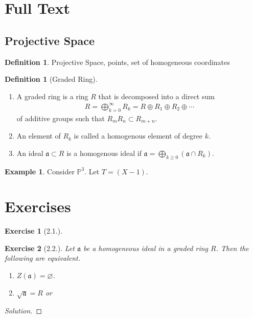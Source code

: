\documentclass[11pt]{book}
\newtheorem{exercise}{Exercise}[section]
\newenvironment{solution}
  {\renewcommand{\qedsymbol}{}\begin{proof}[Solution]}
  {\end{proof}}
\theoremstyle{definition}
\newtheorem{definition}[theorem]{Definition}
\newtheorem{example}[theorem]{Example}
\numberwithin{equation}{section}
\begin{document}
\section{Full Text}

\subsection{Projective Space}
\begin{defbox}
    \begin{definition}
        Projective Space, points, set of homogeneous coordinates
    \end{definition}
\end{defbox}
\begin{defbox}
    \begin{definition}[Graded Ring]
        \begin{enumerate}
            \item A graded ring is a ring \(R\) that is decomposed into a direct sum
            \begin{align*}
                R = \bigoplus_{k=0}^\infty R_k = R \oplus R_1 \oplus R_2 \oplus \cdots
            \end{align*}
            of additive groups such that \(R_m R_n \subset R_{m+n}\).
            \item An element of \(R_k\) is called a homogenous element of degree \(k\).
            \item An ideal \(\mathfrak{a} \subset R\) is a homogenous ideal if \(\mathfrak{a} = \bigoplus_{k \geq 0}(\mathfrak{a} \cap R_k)\).
        \end{enumerate}

    \end{definition}
\end{defbox}

\begin{example}
    Consider \(\mathbb{P}^3\). Let \(T = (X - 1)\).
\end{example}

\newpage
\section{Exercises}
\begin{exercise}[2.1.]
    
\end{exercise}

\begin{exercise}[2.2.]
    Let \(\mathfrak{a}\) be a homogeneous ideal in a graded ring \(R\). Then the following are equivalent.
    \begin{enumerate}
        \item \(Z(\mathfrak{a}) = \varnothing\).
        \item \(\sqrt{\mathfrak{a}} = R\) or
    \end{enumerate}
\end{exercise}
\begin{solution}
    
\end{solution}
\end{document}

